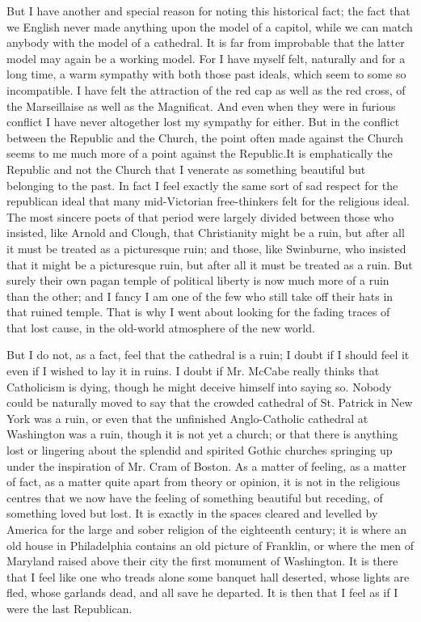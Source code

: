 \documentclass{book}
\begin{document}
But I have another and special reason for noting this historical fact; the fact that we English never made anything upon the model of a capitol, while we can match anybody with the model of a cathedral. It is far from improbable that the latter model may again be a working model. For I have myself felt, naturally and for a long time, a warm sympathy with both those past ideals, which seem to some so incompatible. I have felt the attraction of the red cap as well as the red cross, of the Marseillaise as well as the Magnificat. And even when they were in furious conflict I have never altogether lost my sympathy for either. But in the conflict between the Republic and the Church, the point often made against the Church seems to me much more of a point against the Republic.\footnotemark[1] It is emphatically the Republic and not the Church that I venerate as something beautiful but belonging to the past. In fact I feel exactly the same sort of sad respect for the republican ideal that many mid-Victorian free-thinkers felt for the religious ideal. The most sincere poets of that period were largely divided between those who insisted, like Arnold and Clough, that Christianity might be a ruin, but after all it must be treated as a picturesque ruin; and those, like Swinburne, who insisted that it might be a picturesque ruin, but after all it must be treated as a ruin. But surely their own pagan temple of political liberty is now much more of a ruin than the other; and I fancy I am one of the few who still take off their hats in that ruined temple. That is why I went about looking for the fading traces of that lost cause, in the old-world atmosphere of the new world.

But I do not, as a fact, feel that the cathedral is a ruin; I doubt if I should feel it even if I wished to lay it in ruins. I doubt if Mr. McCabe really thinks that Catholicism is dying, though he might deceive himself into saying so. Nobody could be naturally moved to say that the crowded cathedral of St. Patrick in New York was a ruin, or even that the unfinished Anglo-Catholic cathedral at Washington was a ruin, though it is not yet a church; or that there is anything lost or lingering about the splendid and spirited Gothic churches springing up under the inspiration of Mr. Cram of Boston. As a matter of feeling, as a matter of fact, as a matter quite apart from theory or opinion, it is not in the religious centres that we now have the feeling of something beautiful but receding, of something loved but lost. It is exactly in the spaces cleared and levelled by America for the large and sober religion of the eighteenth century; it is where an old house in Philadelphia contains an old picture of Franklin, or where the men of Maryland raised above their city the first monument of Washington. It is there that I feel like one who treads alone some banquet hall deserted, whose lights are fled, whose garlands dead, and all save he departed. It is then that I feel as if I were the last Republican.
\end{document}
